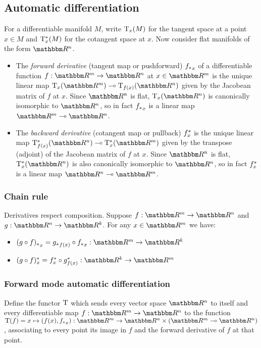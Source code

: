 \subsection{Automatic differentiation}

For a differentiable manifold $M$, write $\mathrm{T}_x(M)$ for the tangent space at a point $x \in M$ and
$\mathrm{T}^*_x(M)$ for the cotangent space at $x$. Now consider flat manifolds of the form $\RR^n$.

\begin{itemize}
\item The \emph{forward derivative} (tangent map or pushforward) ${f_{*}}_x$ of a differentiable function
$f: \RR^m \to \RR^n$ at $x \in \RR^m$ is the unique linear map $\tangents_x(\RR^m) \linearto
\tangents_{f(x)}(\RR^n)$ given by the Jacobean matrix of $f$ at $x$. Since $\RR^n$ is flat,
$\tangents_x(\RR^n)$ is canonically isomorphic to $\RR^n$, so in fact ${f_{*}}_x$ is a linear map $\RR^m
\linearto \RR^n$.
\item The \emph{backward derivative} (cotangent map or pullback) $f^{*}_x$ is the unique linear map
$\cotangents_{f(x)}(\RR^n) \linearto \cotangents_x(\RR^m)$ given by the transpose (adjoint) of the Jacobean
matrix of $f$ at $x$. Since $\RR^n$ is flat, $\cotangents_x(\RR^n)$ is also canonically isomorphic to $\RR^n$,
so in fact $f^{*}_x$ is a linear map $\RR^n \linearto \RR^m$.
\end{itemize}

\subsubsection{Chain rule}

Derivatives respect composition. Suppose $f: \RR^m \to \RR^n$ and $g: \RR^n \to \RR^k$. For any $x \in \RR^m$
we have:

\begin{itemize}
\item $\pushf{(g \comp f)}_x = \pushf{g}_{f(x)} \comp \pushf{f}_x: \RR^m \to \RR^k$
\item $\pullf{(g \comp f)}_x = \pullf{f}_{x} \comp \pullf{g}_{f(x)}: \RR^k \to \RR^m$
\end{itemize}

\subsubsection{Forward mode automatic differentiation}

\begin{definition}
Define the functor $\mathrm{T}$ which sends every vector space $\RR^n$ to itself and every differentiable map
$f: \RR^m \to \RR^n$ to the function $\tangents(f) = x \mapsto (f(x), \pushf{f}_x): \RR^m \to \RR^n \times
(\RR^m \linearto \RR^n)$, associating to every point its image in $f$ and the forward derivative of $f$ at
that point.
\end{definition}

